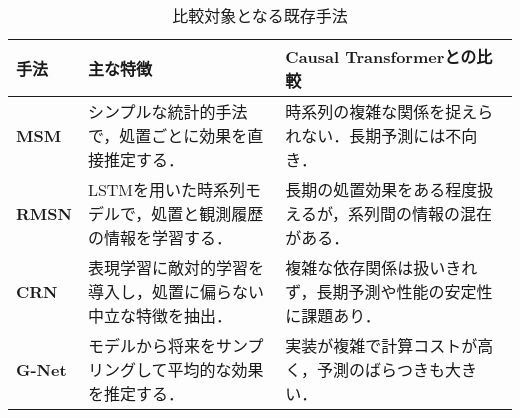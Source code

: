 \documentclass[dvipdfmx]{jreport}
\begin{document}
\begin{table}[htbp]
    \centering
    \caption{比較対象となる既存手法}
    \begin{tabular}{|l|p{5.5cm}|p{5.8cm}|}
    \hline
    \textbf{手法} & \textbf{主な特徴} & \textbf{Causal Transformerとの比較} \\
    \hline
    \textbf{MSM} & シンプルな統計的手法で，処置ごとに効果を直接推定する． & 時系列の複雑な関係を捉えられない．長期予測には不向き． \\
    \hline
    \textbf{RMSN} & LSTMを用いた時系列モデルで，処置と観測履歴の情報を学習する． & 長期の処置効果をある程度扱えるが，系列間の情報の混在がある． \\
    \hline
    \textbf{CRN} & 表現学習に敵対的学習を導入し，処置に偏らない中立な特徴を抽出． & 複雑な依存関係は扱いきれず，長期予測や性能の安定性に課題あり． \\
    \hline
    \textbf{G-Net} & モデルから将来をサンプリングして平均的な効果を推定する． & 実装が複雑で計算コストが高く，予測のばらつきも大きい． \\
    \hline
    \end{tabular}
    \label{tab:method_comparison}
\end{table}
\end{document}
